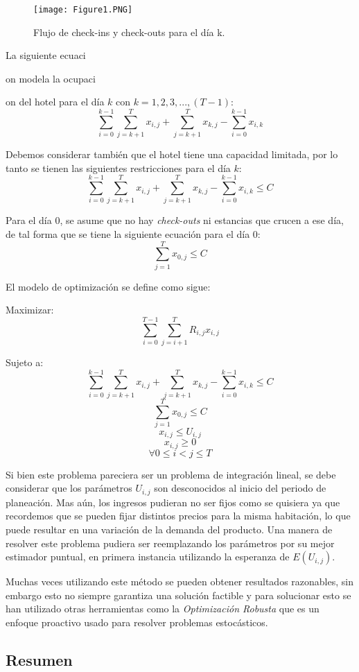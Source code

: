 {\begin{figure}
  \texttt{[image: Figure1.PNG]}
  \caption{Flujo de check-ins y check-outs para el día k.}
  \label{fig:Figure2.2}
\end{figure}

La siguiente ecuaci{on modela la ocupaci{on del hotel para el día $k$ con $k = 1,2,3,...,(T-1)$:$$\sum_{i=0}^{k-1}\sum_{j=k+1}^{T} x_{i,j} + \sum_{j=k+1}^{T} x_{k,j} - \sum_{i=0}^{k-1} x_{i,k}$$

Debemos considerar también que el hotel tiene una capacidad limitada, por lo tanto se tienen las siguientes restricciones para el día $k$:
$$\sum_{i=0}^{k-1}\sum_{j=k+1}^{T} x_{i,j} + \sum_{j=k+1}^{T} x_{k,j} - \sum_{i=0}^{k-1} x_{i,k} \leq C$$

Para el día 0, se asume que no hay \emph{check-outs} ni estancias que crucen a ese día, de tal forma que se tiene la siguiente ecuación para el día 0: 
$$\sum_{j=1}^{T} x_{0,j} \leq C$$

El modelo de optimización se define como sigue:

Maximizar: $$\sum_{i=0}^{T-1}\sum_{j=i+1}^{T} R_{i,j}x_{i,j}$$

Sujeto a: $$\sum_{i=0}^{k-1}\sum_{j=k+1}^{T} x_{i,j} + \sum_{j=k+1}^{T} x_{k,j} - \sum_{i=0}^{k-1} x_{i,k} \leq C$$
$$\sum_{j=1}^{T} x_{0,j} \leq C$$
$$x_{i,j} \leq U_{i,j}$$
$$x_{i,j} \geq 0$$
$$\forall 0\leq i < j \leq T$$

Si bien este problema pareciera ser un problema de integración lineal, se debe considerar que los parámetros $U_{i,j}$ son desconocidos al inicio del periodo de planeación. Mas aún, los ingresos pudieran no ser fijos como se quisiera ya que recordemos que se pueden fijar distintos precios para la misma habitación, lo que puede resultar en una variación de la demanda del producto. Una manera de resolver este problema pudiera ser reemplazando los parámetros por su mejor estimador puntual, en primera instancia utilizando la esperanza de $E(U_{i,j})$.

Muchas veces utilizando este método se pueden obtener resultados razonables, sin embargo esto no siempre garantiza una solución factible y para solucionar esto se han utilizado otras herramientas como la \emph{Optimización Robusta} que es un enfoque proactivo usado para resolver problemas estocásticos.

\subsection*{Resumen}

}}}
